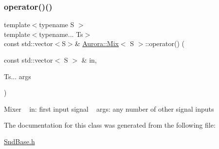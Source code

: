 \subsubsection{\texorpdfstring{operator()()}{operator()()}}
{\footnotesize\ttfamily template$<$typename S $>$ \\
template$<$typename... Ts$>$ \\
const std\+::vector$<$S$>$\& \hyperlink{class_aurora_1_1_mix}{Aurora\+::\+Mix}$<$ S $>$\+::operator() (\begin{DoxyParamCaption}\item[{const std\+::vector$<$ S $>$ \&}]{in,  }\item[{Ts...}]{args }\end{DoxyParamCaption})\hspace{0.3cm}{\ttfamily [inline]}}

Mixer ~\newline
in\+: first input signal ~\newline
args\+: any number of other signal inputs 

The documentation for this class was generated from the following file\+:\begin{DoxyCompactItemize}
\item 
\hyperlink{_snd_base_8h}{Snd\+Base.\+h}\end{DoxyCompactItemize}
